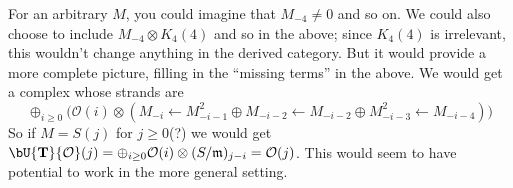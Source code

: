 \documentclass[12pt]{amsart}
\theoremstyle{definition}
\theoremstyle{remark}
\newcommand{\Tate}{{\mathbf{T}}}
\newcommand{\Hom}{\operatorname{Hom}} %
\newcommand{\cO}{{\mathcal O}}
\newcommand{\daniel}[1]{{\color{blue} \sf $\clubsuit\clubsuit\clubsuit$ Daniel: [#1]}}
\begin{document}
For an arbitrary $M$, you could imagine that $M_{-4}\ne 0$ and so on.  We could also choose to include $M_{-4}\otimes K_4(4)$ and so in the above; since $K_4(4)$ is irrelevant, this wouldn't change anything in the derived category.  But it would provide a more complete picture, filling in the ``missing terms'' in the above.  We would get a complex whose strands are
\[
\oplus_{i\geq 0} \bigg( \cO(i) \otimes (M_{-i} \gets M_{-i-1}^2\oplus M_{-i-2} \gets M_{-i-2}\oplus M_{-i-3}^2 \gets M_{-i-4}) \bigg)
\]
So if $M=S(j)$ for $j\geq 0$(?) we would get $\bU \Tate \cO(j) = \oplus_{i\geq 0} \cO(i) \otimes (S/\mathfrak m)_{j-i} = \cO(j)$.  This would seem to have potential to work in the more general setting.
%
%
%

%
%
%
%
%
\end{document}
